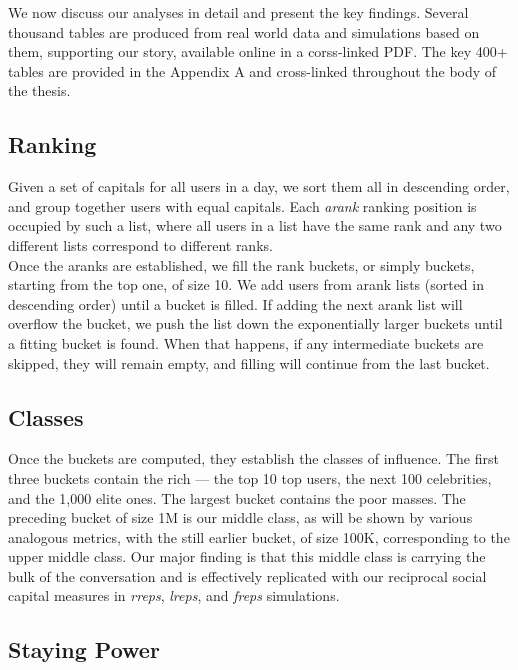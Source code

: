 \documentclass[10pt,oneside]{memoir}
\begin{document}
\begin{Spacing}{2}
We now discuss our analyses in detail and present the key findings.  Several thousand tables are produced from real world data and simulations based on them, supporting our story, available online in a corss-linked PDF.  The key 400+ tables are provided in the Appendix A and cross-linked throughout the body of the thesis.


\subsection{Ranking}
\label{ranking}

Given a set of capitals for all users in a day, we sort them all in descending order, and group together users with equal capitals.  Each \emph{arank} ranking position is occupied by such a list, where all users in a list have the same rank and any two different lists correspond to different ranks. \\
Once the aranks are established, we fill the rank buckets, or simply buckets, starting from the top one, of size 10.  We add users from arank lists (sorted in descending order) until a bucket is filled.  If adding the next arank list will overflow the bucket, we push the list down the exponentially larger buckets until a fitting bucket is found.  When that happens, if any intermediate buckets are skipped, they will remain empty, and filling will continue from the last bucket.


\subsection{Classes}
\label{classes}

Once the buckets are computed, they establish the classes of influence.  The first three buckets contain the rich --- the top 10 top users, the next 100 celebrities, and the 1,000 elite ones.  The largest bucket contains the poor masses.  The preceding bucket of size 1M is our middle class, as will be shown by various analogous metrics, with the still earlier bucket, of size 100K, corresponding to the upper middle class. Our major finding is that this middle class is carrying the bulk of the conversation and is effectively replicated with our reciprocal social capital measures in \emph{rreps}, \emph{lreps}, and \emph{freps} simulations.


\subsection{Staying Power}
\label{stayingpower}


\end{Spacing}
\end{document}
